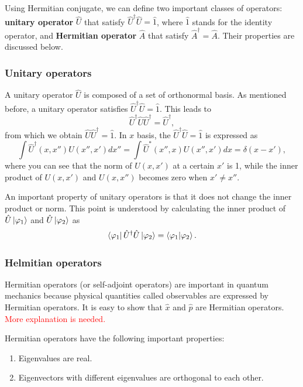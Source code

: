 \documentclass{book}
\begin{document}
Using Hermitian conjugate, we can define two important classes of operators: \textbf{unitary operator} $\hat U$ that satisfy $\hat U^\dagger \hat U = \hat 1$, where $\hat 1$ stands for the identity operator, and \textbf{Hermitian operator} $\hat A$ that satisfy $\hat A^\dagger = \hat A$. Their properties are discussed below.

\subsubsection{Unitary operators}
A unitary operator $\hat U$ is composed of a set of orthonormal basis. As mentioned before, a unitary operator satisfies $\hat U^\dagger\hat U = \hat 1$. This leads to 
\begin{equation}
  \hat U^\dagger\hat U \hat U^\dagger = \hat U^\dagger,
\end{equation}
from which we obtain $\hat U \hat U^\dagger = \hat 1$. In $x$ basis, the $\hat U^\dagger \hat U = \hat 1$ is expressed as
\begin{equation}
  \int \hat U^\dagger(x,x'') U(x'',x')dx'' = \int \hat U^*(x'',x) U(x'',x')dx = \delta(x - x'),
\end{equation}
where you can see that the norm of $U(x, x')$ at a certain $x'$ is 1, while the inner product of $U(x, x')$ and $U(x, x'')$ becomes zero when $x' \neq x''$.

An important property of unitary operators is that it does not change the inner product or norm. This point is understood by calculating the inner product of $\hat U\ket{\varphi_1}$ and $\hat U\ket{\varphi_2}$ as
\begin{equation}
  \bra{\varphi_1}\hat U^\dagger\hat U\ket{\varphi_2} = \braket{\varphi_1|\varphi_2}.
\end{equation}


\subsubsection{Helmitian operators}
Hermitian operators (or self-adjoint operators) are important in quantum mechanics because physical quantities called observables are expressed by Hermitian operators. It is easy to show that $\hat x$ and $\hat p$ are Hermitian operators. \textcolor{red}{More explanation is needed.}

Hermitian operators have the following important properties: 
\begin{enumerate}
	\item Eigenvalues are real.
	\item Eigenvectors with different eigenvalues are orthogonal to each other. 
\end{enumerate}
\end{document}
